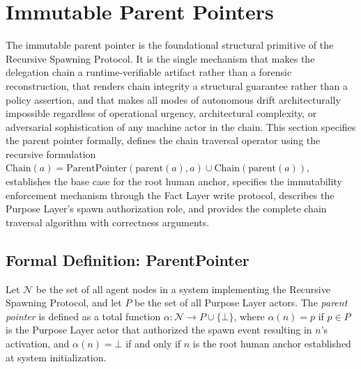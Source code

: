 \section{Immutable Parent Pointers}
\label{sec:immutable-parent-pointers}

The immutable parent pointer is the foundational structural primitive of the Recursive Spawning Protocol. It is the single mechanism that makes the delegation chain a runtime-verifiable artifact rather than a forensic reconstruction, that renders chain integrity a structural guarantee rather than a policy assertion, and that makes all modes of autonomous drift architecturally impossible regardless of operational urgency, architectural complexity, or adversarial sophistication of any machine actor in the chain. This section specifies the parent pointer formally, defines the chain traversal operator using the recursive formulation $\mathrm{Chain}(a) = \mathrm{ParentPointer}(\mathrm{parent}(a), a) \cup \mathrm{Chain}(\mathrm{parent}(a))$, establishes the base case for the root human anchor, specifies the immutability enforcement mechanism through the Fact Layer write protocol, describes the Purpose Layer's spawn authorization role, and provides the complete chain traversal algorithm with correctness arguments.

\subsection{Formal Definition: ParentPointer}
\label{sec:parent-pointer-definition}

Let $\mathcal{N}$ be the set of all agent nodes in a \bxthree{} system implementing the Recursive Spawning Protocol, and let $P$ be the set of all Purpose Layer actors. The \emph{parent pointer} is defined as a total function $\alpha : \mathcal{N} \rightarrow P \cup \{\bot\}$, where $\alpha(n) = p$ if $p \in P$ is the Purpose Layer actor that authorized the spawn event resulting in $n$'s activation, and $\alpha(n) = \bot$ if and only if $n$ is the root human anchor established at system initialization.

